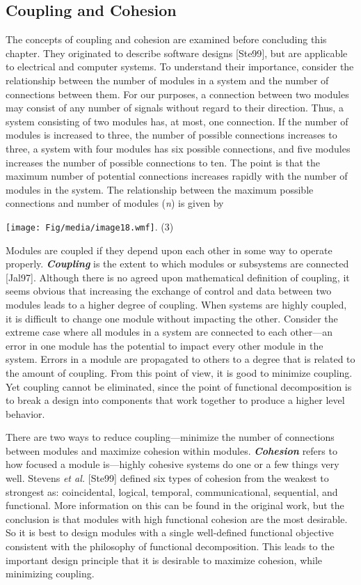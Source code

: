 \subsection{Coupling and Cohesion}\label{coupling-and-cohesion}

The concepts of coupling and cohesion are examined before concluding
this chapter. They originated to describe software designs {[}Ste99{]},
but are applicable to electrical and computer systems. To understand
their importance, consider the relationship between the number of
modules in a system and the number of connections between them. For our
purposes, a connection between two modules may consist of any number of
signals without regard to their direction. Thus, a system consisting of
two modules has, at most, one connection. If the number of modules is
increased to three, the number of possible connections increases to
three, a system with four modules has six possible connections, and five
modules increases the number of possible connections to ten. The point
is that the maximum number of potential connections increases rapidly
with the number of modules in the system. The relationship between the
maximum possible connections and number of modules (\emph{n}) is given
by

\texttt{[image: Fig/media/image18.wmf]}. (3)

Modules are coupled if they depend upon each other in some way to
operate properly. \emph{\textbf{Coupling}} is the extent to which
modules or subsystems are connected {[}Jal97{]}. Although there is no
agreed upon mathematical definition of coupling, it seems obvious that
increasing the exchange of control and data between two modules leads to
a higher degree of coupling. When systems are highly coupled, it is
difficult to change one module without impacting the other. Consider the
extreme case where all modules in a system are connected to each
other---an error in one module has the potential to impact every other
module in the system. Errors in a module are propagated to others to a
degree that is related to the amount of coupling. From this point of
view, it is good to minimize coupling. Yet coupling cannot be
eliminated, since the point of functional decomposition is to break a
design into components that work together to produce a higher level
behavior.

There are two ways to reduce coupling---minimize the number of
connections between modules and maximize cohesion within modules.
\emph{\textbf{Cohesion}} refers to how focused a module is---highly
cohesive systems do one or a few things very well. Stevens \emph{et al.}
{[}Ste99{]} defined six types of cohesion from the weakest to strongest
as: coincidental, logical, temporal, communicational, sequential, and
functional. More information on this can be found in the original work,
but the conclusion is that modules with high functional cohesion are the
most desirable. So it is best to design modules with a single
well-defined functional objective consistent with the philosophy of
functional decomposition. This leads to the important design principle
that it is desirable to maximize cohesion, while minimizing coupling.

